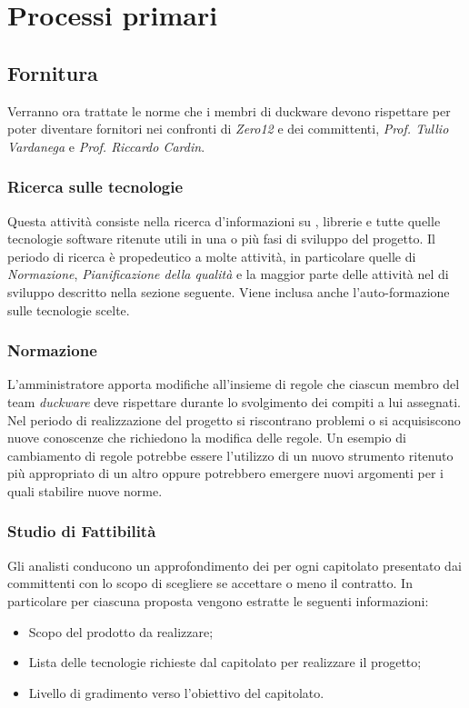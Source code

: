 \clearpage
\section{Processi primari}
\label{sec:proc_prim}
\subsection{Fornitura}
\label{sec:fornitura}
Verranno ora trattate le norme che i membri di duckware devono rispettare per poter diventare fornitori nei confronti di \emph{Zero12} e dei committenti, \emph{Prof. Tullio Vardanega} e \emph{Prof. Riccardo Cardin}.
\subsubsection{Ricerca sulle tecnologie}
Questa attività consiste nella ricerca d'informazioni su , librerie e tutte quelle tecnologie software ritenute utili in una o più fasi di sviluppo del progetto. Il periodo di ricerca è propedeutico a molte attività, in particolare quelle di \emph{Normazione}, \emph{Pianificazione della qualità} e la maggior parte delle attività nel  di sviluppo descritto nella sezione seguente. Viene inclusa anche l'auto-formazione sulle tecnologie scelte.
\subsubsection{Normazione} 
L'amministratore apporta modifiche all'insieme di regole che ciascun membro del team \emph{duckware} deve rispettare durante lo svolgimento dei compiti a lui assegnati. Nel periodo di realizzazione del progetto si riscontrano problemi o si acquisiscono nuove conoscenze che richiedono la modifica delle regole. Un esempio di cambiamento di regole potrebbe essere l'utilizzo di un nuovo strumento ritenuto più appropriato di un altro oppure potrebbero emergere nuovi argomenti per i quali stabilire nuove norme.
\subsubsection{Studio di Fattibilità}
Gli analisti conducono un approfondimento dei  per ogni capitolato presentato dai committenti con lo scopo di scegliere se accettare o meno il contratto. In particolare per ciascuna proposta vengono estratte le seguenti informazioni:
\begin{itemize}
	\item Scopo del prodotto da realizzare;
	\item Lista delle tecnologie richieste dal capitolato per realizzare il progetto;
	\item Livello di gradimento verso l'obiettivo del capitolato.
\end{itemize}

